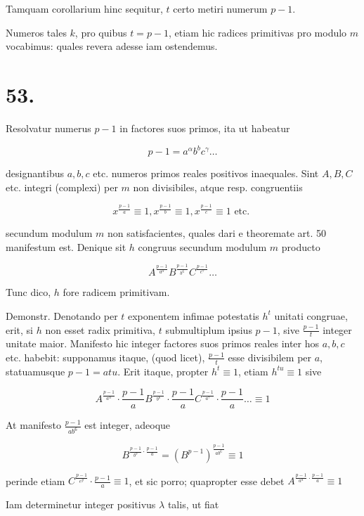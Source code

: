 \documentclass[10pt]{article}
\begin{document}
Tamquam corollarium hinc sequitur, \(t\) certo metiri numerum \(p-1\).

Numeros tales \(k\), pro quibus \(t=p-1\), etiam hic radices primitivas pro modulo \(m\) vocabimus: quales revera adesse iam ostendemus.

\section*{53.}
Resolvatur numerus \(p-1\) in factores suos primos, ita ut habeatur

\[
p-1=a^{\alpha} b^{b} c^{\gamma} \ldots
\]

designantibus \(a, b, c\) etc. numeros primos reales positivos inaequales. Sint \(A, B, C\) etc. integri (complexi) per \(m\) non divisibiles, atque resp. congruentiis

\[
x^{\frac{p-1}{a}} \equiv 1, x^{\frac{p-1}{b}} \equiv 1, x^{\frac{p-1}{c}} \equiv 1 \text { etc. }
\]

secundum modulum \(m\) non satisfacientes, quales dari e theoremate art. 50 manifestum est. Denique sit \(h\) congruus secundum modulum \(m\) producto

\[
A^{\frac{p-1}{a^{\alpha}}} B^{\frac{p-1}{b^{6}}} C^{\frac{p-1}{c^{\gamma}}} \ldots
\]

Tunc dico, \(h\) fore radicem primitivam.

Demonstr. Denotando per \(t\) exponentem infimae potestatis \(h^{t}\) unitati congruae, erit, si \(h\) non esset radix primitiva, \(t\) submultiplum ipsius \(p-1\), sive \(\frac{p-1}{t}\) integer unitate maior. Manifesto hic integer factores suos primos reales inter hos \(a, b, c\) etc. habebit: supponamus itaque, (quod licet), \(\frac{p-1}{t}\) esse divisibilem per \(a\), statuamusque \(p-1=a t u\). Erit itaque, propter \(h^{t} \equiv 1\), etiam \(h^{t u} \equiv 1\) sive

\[
A^{\frac{p-1}{a^{\alpha}}} \cdot \frac{p-1}{a} B^{\frac{p-1}{b^{6}}} \cdot \frac{p-1}{a} C^{\frac{p-1}{a^{\gamma}}} \cdot \frac{p-1}{a} \ldots \equiv 1
\]

At manifesto \(\frac{p-1}{a b^{6}}\) est integer, adeoque

\[
B^{\frac{p-1}{b^{b}} \cdot \frac{p-1}{a}}=\left(B^{p-1}\right)^{\frac{p-1}{a b^{6}}} \equiv 1
\]

perinde etiam
\(C^{\frac{p-1}{e^{y}}} \cdot \frac{p-1}{a} \equiv 1\), et sic porro; quapropter esse debet \(A^{\frac{p-1}{a^{a}} \cdot \frac{p-1}{a}} \equiv 1\)

Iam determinetur integer positivus \(\lambda\) talis, ut fiat
\end{document}
